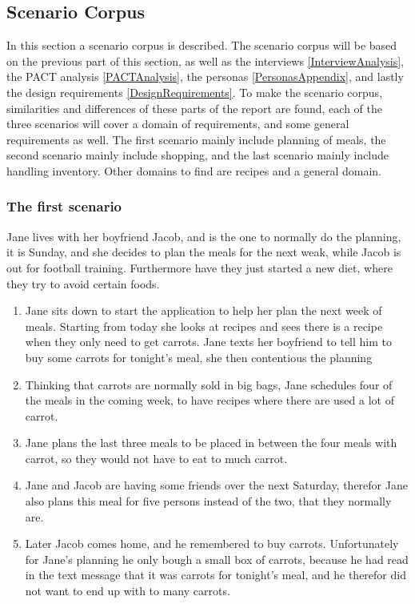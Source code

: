 \subsection{Scenario Corpus} \label{ScenarioCorpus}

In this section a scenario corpus is described. The scenario corpus will be based on the previous part of this section, as well as the interviews \cref{InterviewAnalysis}, the PACT analysis \cref{PACTAnalysis}, the personas \cref{PersonasAppendix}, and lastly the design requirements \cref{DesignRequirements}. To make the scenario corpus, similarities and differences of these parts of the report are found, each of the three scenarios will cover a domain of requirements, and some general requirements as well. The first scenario mainly include planning of meals, the second scenario mainly include shopping, and the last scenario mainly include handling inventory. Other domains to find are recipes and a general domain.

\subsubsection{The first scenario}
Jane lives with her boyfriend Jacob, and is the one to normally do the planning, it is Sunday, and she decides to plan the meals for the next weak, while Jacob is out for football training. Furthermore have they just started a new diet, where they try to avoid certain foods.
\begin{enumerate}
  \item Jane sits down to start the application to help her plan the next week of meals. Starting from today she looks at recipes and sees there is a recipe when they only need to get carrots. Jane texts her boyfriend to tell him to buy some carrots for tonight's meal, she then contentious the planning
  \item Thinking that carrots are normally sold in big bags, Jane schedules four of the meals in the coming week, to have recipes where there are used a lot of carrot.
  \item Jane plans the last three meals to be placed in between the four meals with carrot, so they would not have to eat to much carrot.
  \item Jane and Jacob are having some friends over the next Saturday, therefor Jane also plans this meal for five persons instead of the two, that they normally are.
  \item Later Jacob comes home, and he remembered to buy carrots. Unfortunately for Jane's planning he only bough a small box of carrots, because he had read in the text message that it was carrots for tonight's meal, and he therefor did not want to end up with to many carrots.
\end{enumerate}

